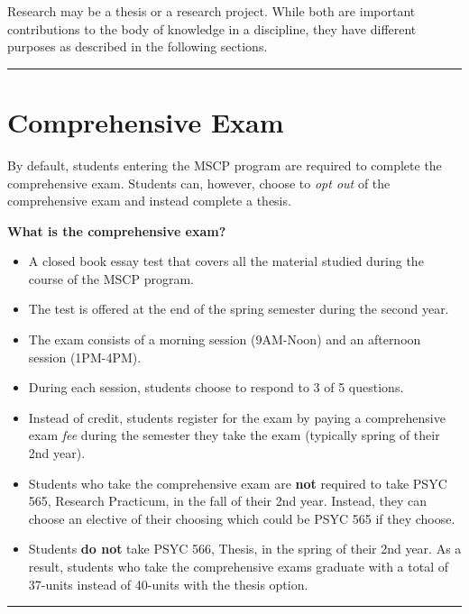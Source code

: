 \documentclass[openany]{book}
\providecommand{\tightlist}{%
  \setlength{\itemsep}{0pt}\setlength{\parskip}{0pt}}
\begin{document}
Research may be a thesis or a research project. While both are important contributions to the body of knowledge in a discipline, they have different purposes as described in the following sections.

\begin{center}\rule{0.5\linewidth}{0.5pt}\end{center}

\hypertarget{comprehensive-exam}{%
\section{Comprehensive Exam}\label{comprehensive-exam}}

By default, students entering the MSCP program are required to complete the comprehensive exam. Students can, however, choose to \emph{opt out} of the comprehensive exam and instead complete a thesis.

\textbf{What is the comprehensive exam?}

\begin{itemize}
\tightlist
\item
  A closed book essay test that covers all the material studied during the course
  of the MSCP program.\\
\item
  The test is offered at the end of the spring semester during the second year.
\item
  The exam consists of a morning session (9AM-Noon) and an afternoon session (1PM-4PM).
\item
  During each session, students choose to respond to 3 of 5 questions.
\item
  Instead of credit, students register for the exam by paying a comprehensive exam \emph{fee}
  during the semester they take the exam (typically spring of their 2nd year).
\item
  Students who take the comprehensive exam are \textbf{not} required to take PSYC 565,
  Research Practicum, in the fall of their 2nd year. Instead, they can choose an
  elective of their choosing which could be PSYC 565 if they choose.
\item
  Students \textbf{do not} take PSYC 566, Thesis, in the spring of their 2nd year. As a
  result, students who take the comprehensive exams graduate with a total of 37-units
  instead of 40-units with the thesis option.
\end{itemize}

\begin{center}\rule{0.5\linewidth}{0.5pt}\end{center}
\end{document}
